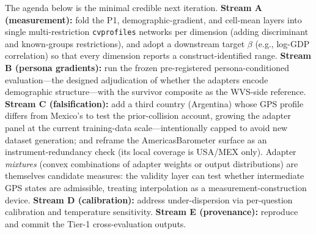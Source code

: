 \documentclass[11pt,letterpaper]{article}
\newcommand{\cvp}{\texttt{cvprofiles}}
\begin{document}
The agenda below is the minimal credible next iteration. \textbf{Stream A (measurement):} fold the P1, demographic-gradient, and cell-mean layers into single multi-restriction \cvp{} networks per dimension (adding discriminant and known-groups restrictions), and adopt a downstream target $\beta$ (e.g., log-GDP correlation) so that every dimension reports a construct-identified range. \textbf{Stream B (persona gradients):} run the frozen pre-registered persona-conditioned evaluation---the designed adjudication of whether the adapters encode demographic structure---with the survivor composite as the WVS-side reference. \textbf{Stream C (falsification):} add a third country (Argentina) whose GPS profile differs from Mexico's to test the prior-collision account, growing the adapter panel at the current training-data scale---intentionally capped to avoid new dataset generation; and reframe the AmericasBarometer surface as an instrument-redundancy check (its local coverage is USA/MEX only). Adapter \emph{mixtures} (convex combinations of adapter weights or output distributions) are themselves candidate measures: the validity layer can test whether intermediate GPS states are admissible, treating interpolation as a measurement-construction device. \textbf{Stream D (calibration):} address under-dispersion via per-question calibration and temperature sensitivity. \textbf{Stream E (provenance):} reproduce and commit the Tier-1 cross-evaluation outputs.
\end{document}
